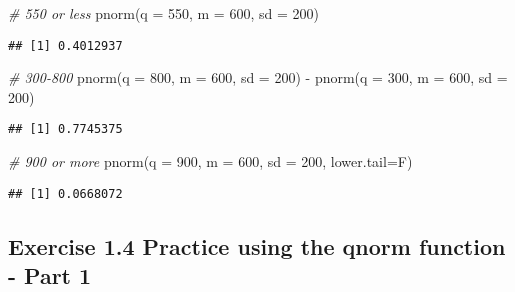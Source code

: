 \documentclass[
]{article}
\newenvironment{Shaded}{\begin{snugshade}}{\end{snugshade}}
\newcommand{\AttributeTok}[1]{\textcolor[rgb]{0.77,0.63,0.00}{#1}}
\newcommand{\CommentTok}[1]{\textcolor[rgb]{0.56,0.35,0.01}{\textit{#1}}}
\newcommand{\DecValTok}[1]{\textcolor[rgb]{0.00,0.00,0.81}{#1}}
\newcommand{\FunctionTok}[1]{\textcolor[rgb]{0.00,0.00,0.00}{#1}}
\newcommand{\NormalTok}[1]{#1}
\newcommand{\SpecialCharTok}[1]{\textcolor[rgb]{0.00,0.00,0.00}{#1}}
\begin{document}
\begin{Shaded}
\begin{Highlighting}[]
\CommentTok{\# 550 or less}
\FunctionTok{pnorm}\NormalTok{(}\AttributeTok{q =} \DecValTok{550}\NormalTok{, }
      \AttributeTok{m =} \DecValTok{600}\NormalTok{, }\AttributeTok{sd =} \DecValTok{200}\NormalTok{)}
\end{Highlighting}
\end{Shaded}

\begin{verbatim}
## [1] 0.4012937
\end{verbatim}

\begin{Shaded}
\begin{Highlighting}[]
\CommentTok{\# 300{-}800}
\FunctionTok{pnorm}\NormalTok{(}\AttributeTok{q =} \DecValTok{800}\NormalTok{, }
      \AttributeTok{m =} \DecValTok{600}\NormalTok{, }\AttributeTok{sd =} \DecValTok{200}\NormalTok{) }\SpecialCharTok{{-}} \FunctionTok{pnorm}\NormalTok{(}\AttributeTok{q =} \DecValTok{300}\NormalTok{, }\AttributeTok{m =} \DecValTok{600}\NormalTok{, }\AttributeTok{sd =} \DecValTok{200}\NormalTok{)}
\end{Highlighting}
\end{Shaded}

\begin{verbatim}
## [1] 0.7745375
\end{verbatim}

\begin{Shaded}
\begin{Highlighting}[]
\CommentTok{\# 900 or more}
\FunctionTok{pnorm}\NormalTok{(}\AttributeTok{q =} \DecValTok{900}\NormalTok{, }
      \AttributeTok{m =} \DecValTok{600}\NormalTok{, }\AttributeTok{sd =} \DecValTok{200}\NormalTok{, }\AttributeTok{lower.tail=}\NormalTok{F)}
\end{Highlighting}
\end{Shaded}

\begin{verbatim}
## [1] 0.0668072
\end{verbatim}

\hypertarget{exercise-1.4-practice-using-the-qnorm-function---part-1}{%
\subsection{Exercise 1.4 Practice using the qnorm function - Part
1}\label{exercise-1.4-practice-using-the-qnorm-function---part-1}}
\end{document}
